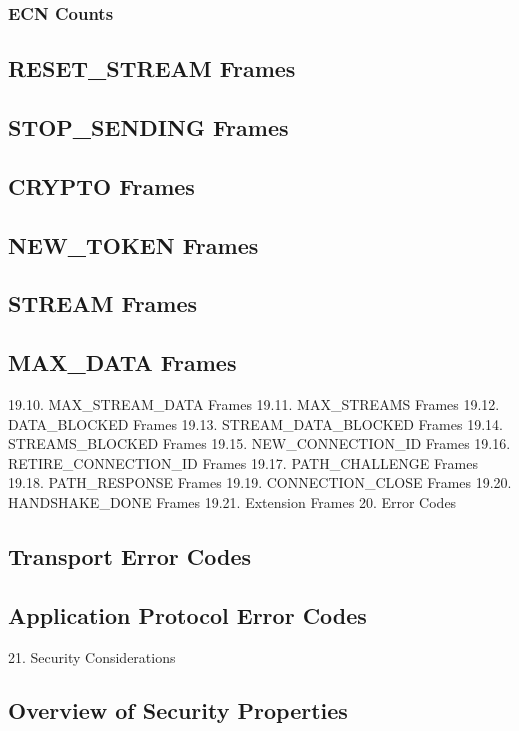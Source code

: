\documentclass{article}
\begin{document}
\subsubsection{ECN Counts}

\subsection{RESET\_STREAM Frames}

\subsection{STOP\_SENDING Frames}

\subsection{CRYPTO Frames}

\subsection{NEW\_TOKEN Frames}

\subsection{STREAM Frames}

\subsection{MAX\_DATA Frames}

19.10. MAX\_STREAM\_DATA Frames 19.11. MAX\_STREAMS Frames 19.12. DATA\_BLOCKED Frames 19.13. STREAM\_DATA\_BLOCKED Frames 19.14. STREAMS\_BLOCKED Frames 19.15. NEW\_CONNECTION\_ID Frames 19.16. RETIRE\_CONNECTION\_ID Frames 19.17. PATH\_CHALLENGE Frames 19.18. PATH\_RESPONSE Frames 19.19. CONNECTION\_CLOSE Frames 19.20. HANDSHAKE\_DONE Frames 19.21. Extension Frames 20. Error Codes

\subsection{Transport Error Codes}

\subsection{Application Protocol Error Codes}

21. Security Considerations

\subsection{Overview of Security Properties}
\end{document}
